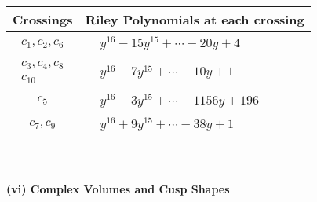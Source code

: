 \documentclass[1p]{elsarticle_modified}
\theoremstyle{definition}
\begin{document}
\begin{tabular}{m{50pt}|m{274pt}}
Crossings & \hspace{64pt}Riley Polynomials at each crossing \\
\hline $$\begin{aligned}c_{1},c_{2},c_{6}\end{aligned}$$&$\begin{aligned}
&y^{16}-15 y^{15}+\cdots-20 y+4
\end{aligned}$\\
\hline $$\begin{aligned}c_{3},c_{4},c_{8}\\c_{10}\end{aligned}$$&$\begin{aligned}
&y^{16}-7 y^{15}+\cdots-10 y+1
\end{aligned}$\\
\hline $$\begin{aligned}c_{5}\end{aligned}$$&$\begin{aligned}
&y^{16}-3 y^{15}+\cdots-1156 y+196
\end{aligned}$\\
\hline $$\begin{aligned}c_{7},c_{9}\end{aligned}$$&$\begin{aligned}
&y^{16}+9 y^{15}+\cdots-38 y+1
\end{aligned}$\\
\hline
\end{tabular}\\~\\
\newpage\flushleft \textbf{(vi) Complex Volumes and Cusp Shapes}
\end{document}
